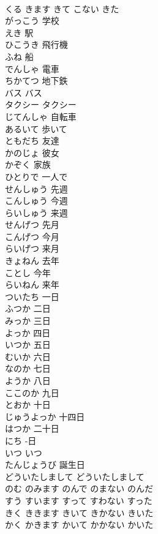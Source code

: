 \documentclass[8pt]{extreport}
\begin{document}
\begin{CJK}{UTF8}{min}
\\	くる	きます	きて	こない	きた	
\\	がっこう	学校
\\	えき	駅
\\	ひこうき	飛行機
\\	ふね	船
\\	でんしゃ	電車
\\	ちかてつ	地下鉄
\\	バス	バス
\\	タクシー	タクシー
\\	じてんしゃ	自転車
\\	あるいて	歩いて
\\	ともだち	友達
\\	かのじょ	彼女
\\	かぞく	家族
\\	ひとりで	一人で
\\	せんしゅう	先週
\\	こんしゅう	今週
\\	らいしゅう	来週
\\	せんげつ	先月
\\	こんげつ	今月
\\	らいげつ	来月
\\	きょねん	去年
\\	ことし	今年
\\	らいねん	来年
\\	ついたち	一日
\\	ふつか	二日
\\	みっか	三日
\\	よっか	四日
\\	いつか	五日
\\	むいか	六日
\\	なのか	七日
\\	ようか	八日
\\	ここのか	九日
\\	とおか	十日
\\	じゅうよっか	十四日
\\	はつか	二十日
\\	にち	-日
\\	いつ	いつ
\\	たんじょうび	誕生日
\\	どういたしまして	どういたしまして
\\	のむ	のみます	のんで	のまない	のんだ	
\\	すう	すいます	すって	すわない	すった	
\\	きく	ききます	きいて	きかない	きいた	
\\	かく	かきます	かいて	かかない	かいた	

\end{CJK}
\end{document}
